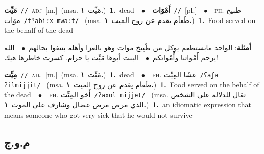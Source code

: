 \documentclass[10pt,a4paper,twoside]{article} %
\begin{document}
\begin{multicols}{2}
{\setlength\topsep{0pt}\textbf{\foreignlanguage{arabic}{مَيِّت}}\ {\color{gray}\texttt{//}\color{black}}\ \textsc{adj}\ [m.]\ \color{gray}(msa. \foreignlanguage{arabic}{مَيِّت}~\foreignlanguage{arabic}{\textbf{١.}})\color{black}\ \textbf{1.}~dead\ \ $\bullet$\ \ \setlength\topsep{0pt}\textbf{\foreignlanguage{arabic}{أَمْوَات}}\ {\color{gray}\texttt{//}\color{black}}\ [pl.]\ \ $\bullet$\ \ \textsc{ph.} \color{gray} \foreignlanguage{arabic}{طبيخ موَات}\color{black}\ {\color{gray}\texttt{/{\sffamily tˤabiːx mwaːt}/}\color{black}}\ \color{gray} (msa. \foreignlanguage{arabic}{طَعاَم يقدم عن روح الميت}~\foreignlanguage{arabic}{\textbf{١.}})\color{black}\ \textbf{1.}~Food served on the behalf of the dead\  \begin{flushright}\color{gray}\foreignlanguage{arabic}{\textbf{\underline{\foreignlanguage{arabic}{أمثلة}}}: الواحد مابستطعم يوكل من طَبِيخ موات وهو بالعزا وأهله بنتفوا بحالهم\ $\bullet$\ \  الله يرحم أََمْواتنا وأََمْواتكم\ $\bullet$\ \  البنت أبوها مَيِّت يا حرام. كسرت خاطرها هيك!}\end{flushright}\color{black}} \vspace{2mm}

{\setlength\topsep{0pt}\textbf{\foreignlanguage{arabic}{مِيِّت}}\ {\color{gray}\texttt{//}\color{black}}\ \textsc{adj}\ [m.]\ \color{gray}(msa. \foreignlanguage{arabic}{مَيِّت}~\foreignlanguage{arabic}{\textbf{١.}})\color{black}\ \textbf{1.}~dead\ \ $\bullet$\ \ \textsc{ph.} \color{gray} \foreignlanguage{arabic}{عشَا المِيِّت}\color{black}\ {\color{gray}\texttt{/{\sffamily ʕaʃa ʔilmijjit}/}\color{black}}\ \color{gray} (msa. \foreignlanguage{arabic}{طَعاَم يقدم عن روح الميت}~\foreignlanguage{arabic}{\textbf{١.}})\color{black}\ \textbf{1.}~Food served on the behalf of the dead\ \ $\bullet$\ \ \textsc{ph.} \color{gray} \foreignlanguage{arabic}{أَخو المِيِّت}\color{black}\ {\color{gray}\texttt{/{\sffamily ʔaxol mijjet}/}\color{black}}\ \color{gray} (msa. \foreignlanguage{arabic}{تقال للدلالة على الشخص الذي مرض مرض عضال وشارف على الموت}~\foreignlanguage{arabic}{\textbf{١.}})\color{black}\ \textbf{1.}~an idiomatic expression that means someone who got very sick that he would not survive\ } \vspace{2mm}

\vspace{-3mm}
\subsection*{\color{blue}\foreignlanguage{arabic}{م.و.ج}\color{blue}{}} 


\end{multicols}
\end{document}
